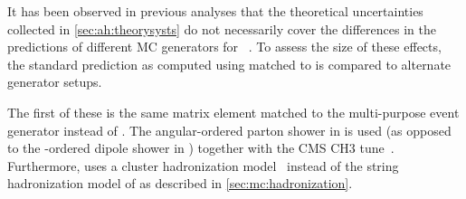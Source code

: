 It has been observed in previous analyses that the theoretical uncertainties collected in \cref{sec:ah:theorysysts} do not necessarily cover the differences in the predictions of different MC generators for \ttbar~\cite{ATLAS:2018ivx,CMS:TOP-17-002,CMS:TOP-23-001,ATLAS:2023fsd}. To assess the size of these effects, the standard \ttbar prediction as computed using \powheg \hvq matched to \pythia is compared to alternate generator setups.%


The first of these is the same \powheg \hvq matrix element matched to the multi-purpose event generator \herwig instead of \pythia. The angular-ordered parton shower in \herwig is used (as opposed to the \pt-ordered dipole shower in \pythia) together with the CMS CH3 tune~\cite{CMS:GEN-19-001}. Furthermore, \herwig uses a cluster hadronization model~\cite{Webber:1983if} instead of the string hadronization model of \pythia as described in \cref{sec:mc:hadronization}.

